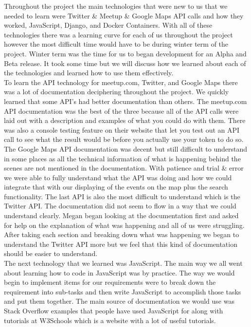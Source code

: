 \documentclass[draftclsnofoot,10pt,onecolumn]{IEEEtran} %
\begin{document}
Throughout the project the main technologies that were new to us that we needed
to learn were Twitter \& Meetup \& Google Maps API calls and how they worked,
JavaScript, Django, and Docker Containers. With all of these technologies there
was a learning curve for each of us throughout the project however the most
difficult time would have to be during winter term of the project. Winter term
was the time for us to began development for an Alpha and Beta release. It took
some time but we will discuss how we learned about each of the technologies and
learned how to use them effectively. \\

To learn the API technology for meetup.com, Twitter, and Google Maps there was a
lot of documentation deciphering throughout the project. We quickly learned that
some API's had better documentation than others. The meetup.com API
documentation was the best of the three because all of the API calls were laid
out with a description and examples of what you could do with them.  There was
also a console testing feature on their website that let you test out an API
call to see what the result would be before you actually use your token to do
so. The Google Maps API documentation was decent but still difficult to
understand in some places as all the technical information of what is happening
behind the scenes are not mentioned in the documentation.  With patience and
trial \& error we were able to fully understand what the API was doing and how
we could integrate that with our displaying of the events on the map plus the
search functionality. The last API is also the most difficult to understand
which is the Twitter API. The documentation did not seem to flow in a way that
we could understand clearly. Megan began looking at the documentation first and
asked for help on the explanation of what was happening and all of us were
struggling. After taking each section and breaking down what was happening we
began to understand the Twitter API more but we feel that this kind of
documentation should be easier to understand. \\

The next technology that we learned was JavaScript. The main way we all went
about learning how to code in JavaScript was by practice. The way we would begin
to implement items for our requirements were to break down the requirement into
sub-tasks and then write JavaScript to accomplish those tasks and put them
together. The main source of documentation we would use was Stack Overflow
examples that people have used JavaScript for along with tutorials at W3Schools
which is a website with a lot of useful tutorials. \\
\end{document}
